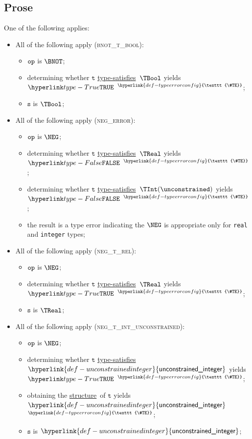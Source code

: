 \documentclass{book}
\newcommand\TypeErrorConfig[0]{\hyperlink{def-typeerrorconfig}{\texttt{\#TE}}}
\newcommand\ProseOrTypeError[0]{\hyperlink{def-proseortypeerror}{$^{\TypeErrorConfig}$}}
\newcommand\unconstrainedinteger[0]{\hyperlink{def-unconstrainedinteger}{\textsf{unconstrained\_integer}}}
\newcommand\structure[0]{\hyperlink{def-structure}{structure}}
\newcommand\typesatisfies[0]{\hyperlink{def-typesatisfies}{type-satisfies}}
\newcommand\vt[0]{\texttt{t}}
\newcommand\vs[0]{\texttt{s}}
\begin{document}
\subsection{Prose}
One of the following applies:
\begin{itemize}
\item All of the following apply (\textsc{bnot\_t\_bool}):
  \begin{itemize}
    \item $\texttt{op}$ is $\BNOT$;
    \item determining whether $\vt$ \typesatisfies\ $\TBool$ yields $\True$ \ProseOrTypeError;
    \item $\vs$ is $\TBool$;
  \end{itemize}

\item All of the following apply (\textsc{neg\_error}):
\begin{itemize}
  \item $\texttt{op}$ is $\NEG$;
  \item determining whether $\vt$ \typesatisfies\ $\TReal$ yields $\False$ \ProseOrTypeError;
  \item determining whether $\vt$ \typesatisfies\ $\TInt(\unconstrained)$ yields $\False$ \ProseOrTypeError;
  \item the result is a type error indicating the $\NEG$ is appropriate only for \texttt{real} and \texttt{integer} types;
\end{itemize}

\item All of the following apply (\textsc{neg\_t\_rel}):
\begin{itemize}
  \item $\texttt{op}$ is $\NEG$;
  \item determining whether $\vt$ \typesatisfies\ $\TReal$ yields $\True$ \ProseOrTypeError;
  \item $\vs$ is $\TReal$;
\end{itemize}

\item All of the following apply (\textsc{neg\_t\_int\_unconstrained}):
\begin{itemize}
  \item $\texttt{op}$ is $\NEG$;
  \item determining whether $\vt$ \typesatisfies\ $\unconstrainedinteger$ yields $\True$ \ProseOrTypeError;
  \item obtaining the \structure\ of $\vt$ yields $\unconstrainedinteger$ \ProseOrTypeError;
  \item $\vs$ is $\unconstrainedinteger$;
\end{itemize}


\end{itemize}
\end{document}
